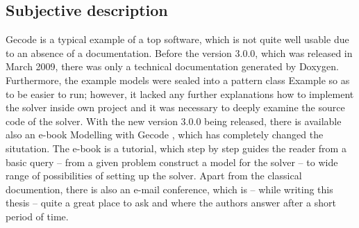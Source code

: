 \subsection{Subjective description}
Gecode is a typical example of a top software, which is not quite well usable due to
an absence of a documentation. Before the version 3.0.0, which was released in March 2009, there
was only a technical documentation generated by Doxygen. Furthermore, the example models were 
sealed into a pattern class Example so as to be easier to run; however, it lacked any further 
explanations how to implement the solver inside own project and it was necessary to deeply
examine the source code of the solver. With the new version 3.0.0 being released, there is
available also an e-book Modelling with Gecode \cite{gecode:modelling}, which has completely changed
the situtation. The e-book is a tutorial, which step by step guides the reader from a basic 
query -- from a given problem construct a model for the solver -- to wide range of possibilities
of setting up the solver. Apart from the classical documention, there is also an e-mail conference,
which is -- while writing this thesis -- quite a great place to ask and where the authors
answer after a short period of time.
